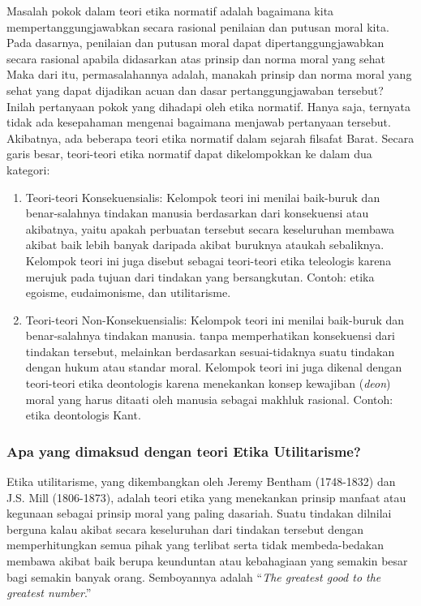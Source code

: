 \documentclass[11pt,twoside,a5paper,openany]{memoir}
\def\tightlist{}
\begin{document}
Masalah pokok dalam teori etika normatif adalah bagaimana kita
mempertanggungjawabkan secara rasional penilaian dan putusan moral kita.
Pada dasarnya, penilaian dan putusan moral dapat dipertanggungjawabkan
secara rasional apabila didasarkan atas prinsip dan norma moral yang
sehat Maka dari itu, permasalahannya adalah, manakah prinsip dan norma
moral yang sehat yang dapat dijadikan acuan dan dasar pertanggungjawaban
tersebut? Inilah pertanyaan pokok yang dihadapi oleh etika normatif.
Hanya saja, ternyata tidak ada kesepahaman mengenai bagaimana menjawab
pertanyaan tersebut. Akibatnya, ada beberapa teori etika normatif dalam
sejarah filsafat Barat. Secara garis besar, teori-teori etika normatif
dapat dikelompokkan ke dalam dua kategori:

\begin{enumerate}
\def\labelenumi{\arabic{enumi}.}
\tightlist
\item
  Teori-teori Konsekuensialis: Kelompok teori ini menilai baik-buruk dan
  benar-salahnya tindakan manusia berdasarkan dari konsekuensi atau
  akibatnya, yaitu apakah perbuatan tersebut secara keseluruhan membawa
  akibat baik lebih banyak daripada akibat buruknya ataukah sebaliknya.
  Kelompok teori ini juga disebut sebagai teori-teori etika teleologis
  karena merujuk pada tujuan dari tindakan yang bersangkutan. Contoh:
  etika egoisme, eudaimonisme, dan utilitarisme.
\item
  Teori-teori Non-Konsekuensialis: Kelompok teori ini menilai baik-buruk
  dan benar-salahnya tindakan manusia. tanpa memperhatikan konsekuensi
  dari tindakan tersebut, melainkan berdasarkan sesuai-tidaknya suatu
  tindakan dengan hukum atau standar moral. Kelompok teori ini juga
  dikenal dengan teori-teori etika deontologis karena menekankan konsep
  kewajiban (\emph{deon}) moral yang harus ditaati oleh manusia sebagai
  makhluk rasional. Contoh: etika deontologis Kant.
\end{enumerate}

\hypertarget{apa-yang-dimaksud-dengan-teori-etika-utilitarisme}{%
\subsubsection{Apa yang dimaksud dengan teori Etika
Utilitarisme?}\label{apa-yang-dimaksud-dengan-teori-etika-utilitarisme}}

Etika utilitarisme, yang dikembangkan oleh Jeremy Bentham (1748-1832)
dan J.S. Mill (1806-1873), adalah teori etika yang menekankan prinsip
manfaat atau kegunaan sebagai prinsip moral yang paling dasariah. Suatu
tindakan dilnilai berguna kalau akibat secara keseluruhan dari tindakan
tersebut dengan memperhitungkan semua pihak yang terlibat serta tidak
membeda-bedakan membawa akibat baik berupa keunduntan atau kebahagiaan
yang semakin besar bagi semakin banyak orang. Semboyannya adalah
``\emph{The greatest good to the greatest number}.''
\end{document}
